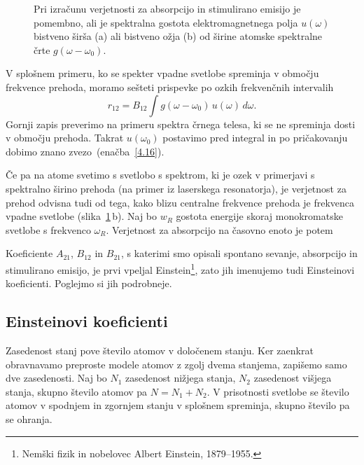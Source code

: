 \begin{figure}[h]
\centering
\def\svgwidth{140truemm} 

\caption{Pri izračunu verjetnosti za absorpcijo in stimulirano emisijo je 
pomembno, ali je spektralna gostota elektromagnetnega polja $u(\omega)$ bistveno širša
(a) ali bistveno ožja (b) od širine atomske spektralne črte $g(\omega-\omega_0)$.}
\label{fig:spektri}
\end{figure}

V splošnem primeru, ko se spekter vpadne svetlobe spreminja v območju 
frekvence prehoda, moramo sešteti prispevke po ozkih frekvenčnih intervalih
\begin{equation}
r_{12}=B_{12}\int g(\omega-\omega_0)\, u(\omega)\, d\omega.
\label{4.19}
\end{equation}
Gornji zapis preverimo na primeru spektra črnega telesa, ki se ne spreminja 
dosti v območju prehoda. Takrat $u(\omega_0)$ postavimo pred integral in po pričakovanju
dobimo znano zvezo~(enačba~\ref{4.16}). 

Če pa na atome svetimo s svetlobo s spektrom, ki je ozek v primerjavi s spektralno 
širino prehoda (na primer iz laserskega resonatorja), je verjetnost za prehod 
odvisna tudi od tega, kako blizu centralne frekvence prehoda je frekvenca vpadne 
svetlobe (slika~\ref{fig:spektri}\,b). Naj bo  $w_{R}$ gostota energije skoraj
monokromatske svetlobe s frekvenco $\omega_R$. Verjetnost za absorpcijo na časovno 
enoto je potem  

Koeficiente $A_{21}$, $B_{12}$ in $B_{21}$, s katerimi smo opisali spontano sevanje,
absorpcijo in stimulirano emisijo, je prvi vpeljal Einstein\footnote{Nemški fizik
in nobelovec Albert Einstein, 1879--1955.}, zato jih imenujemo 
tudi Einsteinovi koeficienti. Poglejmo si jih podrobneje.

\subsection*{Einsteinovi koeficienti}
\label{AB}
Zasedenost stanj pove število atomov v določenem stanju. 
Ker zaenkrat obravnavamo preproste modele atomov z zgolj 
dvema stanjema, zapišemo samo dve zasedenosti. Naj bo $N_1$ zasedenost 
nižjega stanja, $N_{2}$ zasedenost višjega stanja, skupno število atomov pa
$N=N_1+N_2$. V prisotnosti svetlobe se število atomov v spodnjem in zgornjem 
stanju v splošnem spreminja, skupno število pa se ohranja.

